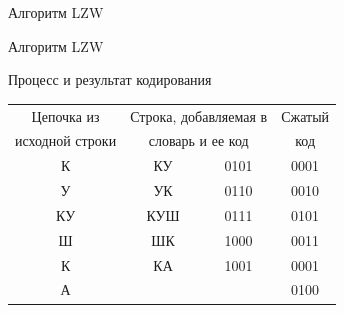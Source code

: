 \documentclass[11pt]{beamer}
\begin{document}
\begin{frame}{Алгоритм LZW}
 
\begin{frame}{Алгоритм LZW}
\begin{block}{Процесс и результат кодирования}
\begin{table}[H]
\begin{center}
	\begin{tabular}{|c|c|c|c|}
		\hline	
		  Цепочка из & \multicolumn{2}{|c|}{Строка, добавляемая в} & Сжатый \\
		  исходной строки & \multicolumn{2}{|c|}{словарь и ее код} & код \\
		\hline
	  	  К    & КУ & 0101 & 0001 \\
		\hline
		  У	   & УК & 0110 & 0010 \\
		\hline  
		  КУ   & КУШ & 0111 & 0101 \\
		\hline  	
		  Ш    & ШК & 1000 & 0011 \\
		\hline
		  К    & КА & 1001 & 0001 \\
		\hline
		  А    &    &      & 0100 \\
		\hline
	\end{tabular}
\end{center}
\end{table}
\end{block}				
\end{frame} 



\end{frame}
\end{document}
